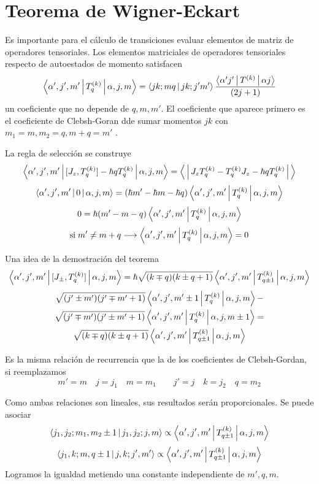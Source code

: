\documentclass[10pt,oneside]{CBFT_book}
\begin{document}
\chapter{Teorema de Wigner-Eckart}



Es importante para el cálculo de transiciones evaluar elementos de matriz de operadores tensoriales.
Los elementos matriciales de operadores tensoriales respecto de autoestados de momento satisfacen 
\[
	\Braket{\alpha',j',m'|T^{(k)}_q|\alpha,j,m} =  \Braket{j k; m q | j k; j' m'}
	\frac{\Braket{\alpha' j'|T^{(k)}|\alpha j}}{(2j+1)}
\]
un coeficiente que no depende de $q,m,m'$. El coeficiente que aparece primero es el coeficiente de 
Clebsh-Goran dde sumar momentos $jk$ con $m_1=m, m_2=q, m+q=m'$ .

La regla de selección se construye 
\[
	\Braket{\alpha',j',m'|[J_z, T^{(k)}_q] - \hbar q T^{(k)}_q |\alpha,j,m} = 
	\Braket{|J_z T^{(k)}_q - T^{(k)}_q J_z - \hbar q T^{(k)}_q|}
\]
\[
	\Braket{\alpha',j',m'|0|\alpha,j,m} = 
	(\hbar m' - \hbar m -\hbar q )\Braket{\alpha',j',m'|T^{(k)}_q|\alpha,j,m}
\]
\[
	0 = \hbar ( m' - m - q ) \Braket{\alpha',j',m'|T^{(k)}_q|\alpha,j,m}
\]
\[
	\text{si} \; m' \neq m+q \longrightarrow \Braket{\alpha',j',m'|T^{(k)}_q|\alpha,j,m} = 0
\]

Una idea de la demostración del teorema
\[
	\Braket{\alpha',j',m'|[J_\pm ,T^{(k)}_q]|\alpha,j,m} = \hbar\sqrt{(k\mp q)(k\pm q + 1)} 
	\Braket{\alpha',j',m'|T^{(k)}_{q\pm 1}|\alpha,j,m}
\]
\begin{multline*}
	\sqrt{(j'\pm m')(j'\mp m' + 1)} \Braket{\alpha',j',m'\pm 1|T^{(k)}_q|\alpha,j,m} - \\
	\sqrt{(j'\mp m')(j'\pm m' + 1)} \Braket{\alpha',j',m'|T^{(k)}_q|\alpha,j,m \pm 1} = \\
	\sqrt{(k\mp q)(k\pm q + 1)}  \Braket{\alpha',j',m'|T^{(k)}_{q\pm 1}|\alpha,j,m}
\end{multline*}

Es la misma relación de recurrencia que la de los coeficientes de Clebsh-Gordan, si reemplazamos
\[
	m'=m \quad j=j_1 \quad m=m_1 \qquad j'=j \quad k=j_2 \quad q=m_2
\]

Como ambas relaciones son lineales, sus resultados serán proporcionales. Se puede asociar 
\[
	\Braket{ j_1, j_2 ; m_1, m_2 \pm 1 | j_1, j_2 ; j, m} \propto 
	\Braket{\alpha',j',m'|T^{(k)}_{q\pm 1}|\alpha,j,m}
\]
\[
	\Braket{ j_1, k ; m, q \pm 1 | j, k ; j', m'} \propto 
	\Braket{\alpha',j',m'|T^{(k)}_{q\pm 1}|\alpha,j,m}
\]
Logramos la igualdad metiendo una constante independiente de $m',q,m$.
\end{document}
